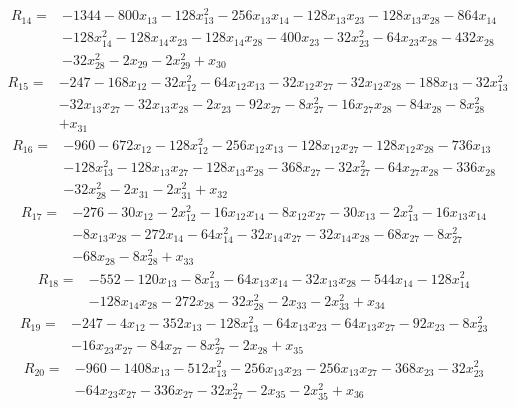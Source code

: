 \[\begin{aligned}R_{14}={}&-1344-800x_{13}-128x_{13}^{2}-256x_{13}x_{14}-128x_{13}x_{23}-128x_{13}x_{28}-864x_{14}
\\&-128x_{14}^{2}-128x_{14}x_{23}-128x_{14}x_{28}-400x_{23}-32x_{23}^{2}-64x_{23}x_{28}-432x_{28}
\\&-32x_{28}^{2}-2x_{29}-2x_{29}^{2}+x_{30}
\end{aligned}\]
\[\begin{aligned}R_{15}={}&-247-168x_{12}-32x_{12}^{2}-64x_{12}x_{13}-32x_{12}x_{27}-32x_{12}x_{28}-188x_{13}-32x_{13}^{2}
\\&-32x_{13}x_{27}-32x_{13}x_{28}-2x_{23}-92x_{27}-8x_{27}^{2}-16x_{27}x_{28}-84x_{28}-8x_{28}^{2}
\\&+x_{31}
\end{aligned}\]
\[\begin{aligned}R_{16}={}&-960-672x_{12}-128x_{12}^{2}-256x_{12}x_{13}-128x_{12}x_{27}-128x_{12}x_{28}-736x_{13}
\\&-128x_{13}^{2}-128x_{13}x_{27}-128x_{13}x_{28}-368x_{27}-32x_{27}^{2}-64x_{27}x_{28}-336x_{28}
\\&-32x_{28}^{2}-2x_{31}-2x_{31}^{2}+x_{32}
\end{aligned}\]
\[\begin{aligned}R_{17}={}&-276-30x_{12}-2x_{12}^{2}-16x_{12}x_{14}-8x_{12}x_{27}-30x_{13}-2x_{13}^{2}-16x_{13}x_{14}
\\&-8x_{13}x_{28}-272x_{14}-64x_{14}^{2}-32x_{14}x_{27}-32x_{14}x_{28}-68x_{27}-8x_{27}^{2}
\\&-68x_{28}-8x_{28}^{2}+x_{33}
\end{aligned}\]
\[\begin{aligned}R_{18}={}&-552-120x_{13}-8x_{13}^{2}-64x_{13}x_{14}-32x_{13}x_{28}-544x_{14}-128x_{14}^{2}
\\&-128x_{14}x_{28}-272x_{28}-32x_{28}^{2}-2x_{33}-2x_{33}^{2}+x_{34}
\end{aligned}\]
\[\begin{aligned}R_{19}={}&-247-4x_{12}-352x_{13}-128x_{13}^{2}-64x_{13}x_{23}-64x_{13}x_{27}-92x_{23}-8x_{23}^{2}
\\&-16x_{23}x_{27}-84x_{27}-8x_{27}^{2}-2x_{28}+x_{35}
\end{aligned}\]
\[\begin{aligned}R_{20}={}&-960-1408x_{13}-512x_{13}^{2}-256x_{13}x_{23}-256x_{13}x_{27}-368x_{23}-32x_{23}^{2}
\\&-64x_{23}x_{27}-336x_{27}-32x_{27}^{2}-2x_{35}-2x_{35}^{2}+x_{36}
\end{aligned}\]
